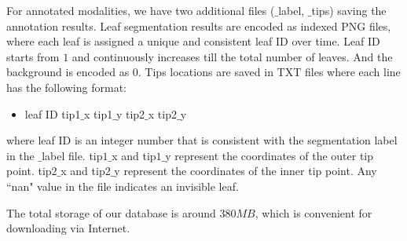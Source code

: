 For annotated modalities, we have two additional files ($\_$label, $\_$tips) saving the annotation results.
Leaf segmentation results are encoded as indexed PNG files, where each leaf is assigned a unique and consistent leaf ID over time.
Leaf ID starts from $1$ and continuously increases till the total number of leaves.
And the background is encoded as $0$.
Tips locations are saved in TXT files where each line has the following format:
\begin{itemize}
\item leaf ID \quad tip1$\_$x \quad tip1$\_$y \quad tip2$\_$x \quad tip2$\_$y
\end{itemize}
where leaf ID is an integer number that is consistent with the segmentation label in the $\_$label file.
tip$1\_$x and tip$1\_$y represent the coordinates of the outer tip point.
tip$2\_$x and tip$2\_$y represent the coordinates of the inner tip point.
Any ``nan" value in the file indicates an invisible leaf. 


The total storage of our database is around $380 MB$, which is convenient for downloading via Internet.

